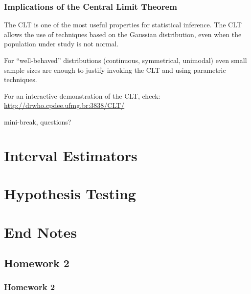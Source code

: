 \documentclass[10pt]{beamer}
\begin{document}
\begin{frame}
  \frametitle{Implications of the Central Limit Theorem} 

  The CLT is one of the most useful properties for statistical
  inference. The CLT allows the use of techniques based on the
  Gaussian distribution, even when the population under study is not
  normal.

  \bigskip
  
  For ``well-behaved'' distributions (continuous, symmetrical,
  unimodal) even small sample sizes are enough to justify invoking the
  CLT and using parametric techniques. 

  \bigskip

  For an interactive demonstration of the CLT, check:
  \url{http://drwho.cpdee.ufmg.br:3838/CLT/}
\end{frame}


\begin{frame}
  \begin{center}
    mini-break, questions?
  \end{center}
\end{frame}


\section{Interval Estimators}
\section{Hypothesis Testing}

\section{End Notes}
\subsection{Homework 2}
\begin{frame}
  \frametitle{Homework 2}


\end{frame}
\end{document}

